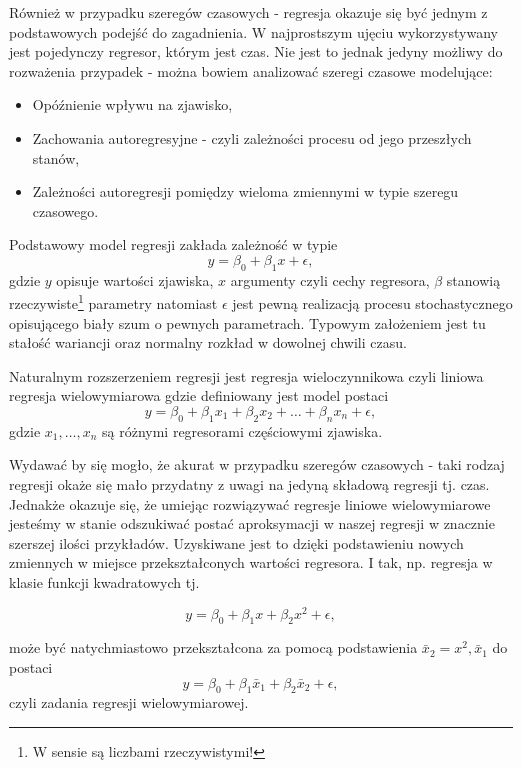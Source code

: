 \documentclass[10pt,a4paper]{book}
\begin{document}
Również w przypadku szeregów czasowych - regresja okazuje się być jednym z podstawowych podejść do zagadnienia. W najprostszym ujęciu wykorzystywany jest pojedynczy regresor, którym jest czas. Nie jest to jednak jedyny możliwy do rozważenia przypadek - można bowiem analizować szeregi czasowe modelujące:
\begin{itemize}
\item Opóźnienie wpływu na zjawisko,
\item Zachowania autoregresyjne - czyli zależności procesu od jego przeszłych stanów,
\item Zależności autoregresji pomiędzy wieloma zmiennymi w typie szeregu czasowego.
\end{itemize}

Podstawowy model regresji zakłada zależność w typie
\begin{equation}
y = \beta_0 + \beta_1 x + \epsilon,
\end{equation}
gdzie $y$ opisuje wartości zjawiska, $x$ argumenty czyli cechy regresora, $\beta$ stanowią rzeczywiste\footnote{W sensie są liczbami rzeczywistymi!} parametry natomiast $\epsilon$ jest pewną realizacją procesu stochastycznego opisującego biały szum o pewnych parametrach. Typowym założeniem jest tu stałość wariancji oraz normalny rozkład w dowolnej chwili czasu.  

Naturalnym rozszerzeniem regresji jest regresja wieloczynnikowa czyli liniowa regresja wielowymiarowa gdzie definiowany jest model postaci
\begin{equation}
y = \beta_0 + \beta_1 x_1 + \beta_2 x_2 + \ldots + \beta_n x_n + \epsilon,
\end{equation}
gdzie $x_1,\dots,x_n$ są różnymi regresorami częściowymi zjawiska. 

Wydawać by się mogło, że akurat w przypadku szeregów czasowych - taki rodzaj regresji okaże się mało przydatny z uwagi na jedyną składową regresji tj. czas. Jednakże okazuje się, że umiejąc rozwiązywać regresje liniowe wielowymiarowe jesteśmy w stanie odszukiwać postać aproksymacji w naszej regresji w znacznie szerszej ilości przykładów. Uzyskiwane jest to dzięki podstawieniu nowych zmiennych w miejsce przekształconych wartości regresora. I tak, np. regresja w klasie funkcji kwadratowych tj.

\begin{equation}
y = \beta_0 + \beta_1 x + \beta_2 x^2 + \epsilon,
\end{equation}

może być natychmiastowo przekształcona za pomocą podstawienia $\bar{x}_2 = x^2, \bar{x}_1$ do postaci
$$
y = \beta_0 + \beta_1 \bar{x}_1 + \beta_2 \bar{x}_2 + \epsilon,
$$
czyli zadania regresji wielowymiarowej. 
\end{document}
